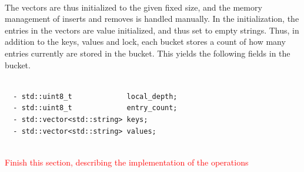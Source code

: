 \documentclass[11pt]{report} %
\begin{document}
\\
The vectors are thus initialized to the given fixed size, and the memory management of inserts and removes is handled manually. In the initialization, the entries in the vectors are value initialized, and thus set to empty strings. Thus, in addition to the keys, values and lock, each bucket stores a count of how many entries currently are stored in the bucket. This yields the following fields in the bucket.\\
\\
\begin{fminipage}{\textwidth}
\begin{lstlisting}
  - std::uint8_t             local_depth;
  - std::uint8_t             entry_count;
  - std::vector<std::string> keys;
  - std::vector<std::string> values;
\end{lstlisting}
\end{fminipage}
\vphantom{fill}\\

\textcolor{red}{Finish this section, describing the implementation of the operations}
\end{document}
